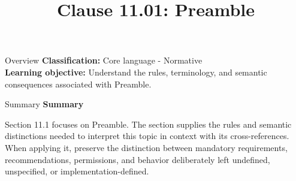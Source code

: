 \documentclass[10pt,letterpaper]{article}
\title{Clause 11.01: Preamble}
\author{}
\date{}
\begin{document}
\maketitle
\begin{CornellOverviewBox}{Overview}
\textbf{Classification:} Core language - Normative\\[2pt]
\textbf{Learning objective:} Understand the rules, terminology, and semantic consequences associated with Preamble.
\end{CornellOverviewBox}\begin{CornellSummaryBox}{Summary}
{\sffamily\bfseries\color{Accent} Summary}\par\vspace{3pt}Section 11.1 focuses on Preamble. The section supplies the rules and semantic distinctions needed to interpret this topic in context with its cross-references. When applying it, preserve the distinction between mandatory requirements, recommendations, permissions, and behavior deliberately left undefined, unspecified, or implementation-defined.
\end{CornellSummaryBox}
\end{document}
